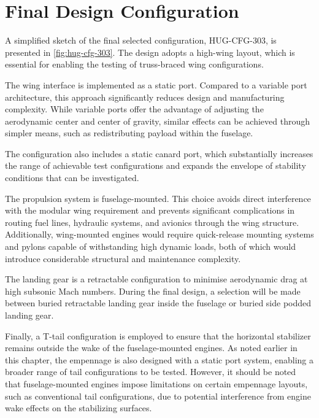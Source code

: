 \section{Final Design Configuration}
\label{sec:trade-off_final_design}

A simplified sketch of the final selected configuration, HUG-CFG-303, is presented in \autoref{fig:hug-cfg-303}. The design adopts a high-wing layout, which is essential for enabling the testing of truss-braced wing configurations.

The wing interface is implemented as a static port. Compared to a variable port architecture, this approach significantly reduces design and manufacturing complexity. While variable ports offer the advantage of adjusting the aerodynamic center and center of gravity, similar effects can be achieved through simpler means, such as redistributing payload within the fuselage.

The configuration also includes a static canard port, which substantially increases the range of achievable test configurations and expands the envelope of stability conditions that can be investigated.

The propulsion system is fuselage-mounted. This choice avoids direct interference with the modular wing requirement and prevents significant complications in routing fuel lines, hydraulic systems, and avionics through the wing structure. Additionally, wing-mounted engines would require quick-release mounting systems and pylons capable of withstanding high dynamic loads, both of which would introduce considerable structural and maintenance complexity.

The landing gear is a retractable configuration to minimise aerodynamic drag at high subsonic Mach numbers. During the final design, a selection will be made between buried retractable landing gear  inside the fuselage or buried side podded landing gear.

Finally, a T-tail configuration is employed to ensure that the horizontal stabilizer remains outside the wake of the fuselage-mounted engines. As noted earlier in this chapter, the empennage is also designed with a static port system, enabling a broader range of tail configurations to be tested. However, it should be noted that fuselage-mounted engines impose limitations on certain empennage layouts, such as conventional tail configurations, due to potential interference from engine wake effects on the stabilizing surfaces.





